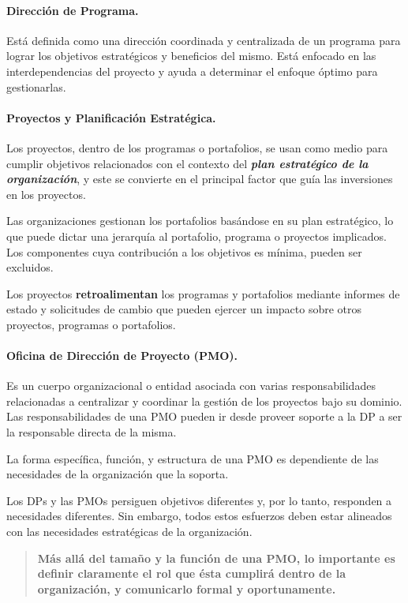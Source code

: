 \documentclass[10pt,a4paper]{article}
\begin{document}
\paragraph{Dirección de Programa.} Está definida como una dirección coordinada y centralizada de un programa para lograr los objetivos estratégicos y beneficios del mismo. Está enfocado en las interdependencias del proyecto y ayuda a determinar el enfoque óptimo para gestionarlas.

\paragraph{Proyectos y Planificación Estratégica.} Los proyectos, dentro de los programas o portafolios, se usan como medio para cumplir objetivos relacionados con el contexto del \textbf{\textit{plan estratégico de la organización}}, y este se convierte en el principal factor que guía las inversiones en los proyectos.

Las organizaciones gestionan los portafolios basándose en su plan estratégico, lo que puede dictar una jerarquía al portafolio, programa o proyectos implicados. Los componentes cuya contribución a los objetivos es mínima, pueden ser excluidos.

Los proyectos \textbf{retroalimentan} los programas y portafolios mediante informes de estado y solicitudes de cambio que pueden ejercer un impacto sobre otros proyectos, programas o portafolios.

\paragraph{Oficina de Dirección de Proyecto (PMO).} Es un cuerpo organizacional o entidad asociada con varias responsabilidades relacionadas a centralizar y coordinar la gestión de los proyectos bajo su dominio. Las responsabilidades de una PMO pueden ir desde proveer soporte a la DP a ser la responsable directa de la misma.

La forma específica, función, y estructura de una PMO es dependiente de las necesidades de la organización que la soporta.

Los DPs y las PMOs persiguen objetivos diferentes y, por lo tanto, responden a necesidades diferentes. Sin embargo, todos estos esfuerzos deben estar alineados con las necesidades estratégicas de la organización.

\begin{quote}
\textbf{Más allá del tamaño y la función de una PMO, lo importante es definir claramente el rol que ésta cumplirá dentro de la organización, y comunicarlo formal y oportunamente.}
\end{quote}
\end{document}
